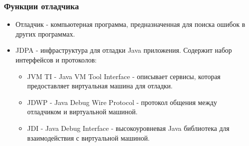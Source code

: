\begin{frame}
\frametitle{Функции отладчика} %
\begin{itemize}
	\item Отладчик - компьютерная программа, предназначенная для поиска ошибок в других программах.
	\item JDPA - инфраструктура для отладки Java приложения. Содержит набор интерфейсов и протоколов:
	\begin{itemize}
		\item JVM TI - Java VM Tool Interface - описывает сервисы, которая предоставляет виртуальная машина для отладки.
		\item JDWP - Java Debug Wire Protocol - протокол общения между отладчиком и виртуальной машиной. 
		\item JDI - Java Debug Interface - высокоуровневая Java библиотека для взаимодействия с виртуальной машиной.
	\end{itemize}
\end{itemize}
\end{frame}
